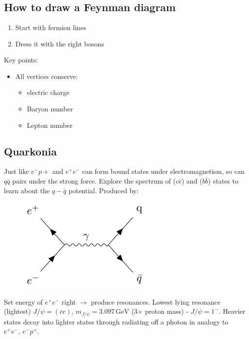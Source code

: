\documentclass[a4paper, 11pt, normalem]{report}
\begin{document}
\chapter{}

\section{How to draw a Feynman diagram}
\begin{enumerate}
    \item Start with fermion lines
    \item Dress it with the right bosons
\end{enumerate}

Key points:
\begin{itemize}
    \item All vertices conserve:
        \begin{itemize}
            \item electric charge
            \item Baryon number
            \item Lepton number
        \end{itemize}
\end{itemize}

\section{Quarkonia}
Just like $e^-p+$ and $e^+e^-$ can form bound states under electromagnetism, so can $q\bar{q}$ pairs under the strong force.
Explore the spectrum of ($c\bar{c}$) and ($b\bar{b}$) states to learn about the $q-\bar{q}$ potential. 
Produced by:
\begin{figure}[H]
    \centering
    \includegraphics{charm}
\end{figure}
Set energy of $e^+e^-$ right $\to$ produce resonances.
Lowest lying resonance (lightest) $J/\psi = (\bar{c}c),\, m_{J/\psi} = 3.097\,\text{GeV}$ (3$\times$ proton mass) - $J/\psi = 1^-$.
Heavier states decay into lighter states through radiating off a photon in analogy to $e^+e^-,\,e^-p^+$.
\end{document}

